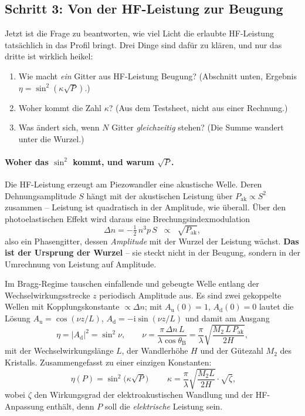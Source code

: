 \documentclass[11pt,a4paper]{article}
\begin{document}
\subsection{Schritt 3: Von der HF-Leistung zur Beugung}\label{sec:beugung}

Jetzt ist die Frage zu beantworten, wie viel Licht die erlaubte HF-Leistung
tatsächlich in das Profil bringt. Drei Dinge sind dafür zu klären, und nur
das dritte ist wirklich heikel:
\begin{enumerate}\itemsep0.15em
  \item Wie macht \emph{ein} Gitter aus HF-Leistung Beugung? (Abschnitt unten,
        Ergebnis $\eta=\sin^2(\kappa\sqrt{P})$.)
  \item Woher kommt die Zahl $\kappa$? (Aus dem Testsheet, nicht aus einer Rechnung.)
  \item Was ändert sich, wenn $N$ Gitter \emph{gleichzeitig} stehen?
        (Die Summe wandert unter die Wurzel.)
\end{enumerate}

\paragraph{Woher das \boldmath$\sin^2$ kommt, und warum \boldmath$\sqrt{P}$.}
Die HF-Leistung erzeugt am Piezowandler eine akustische Welle. Deren
Dehnungsamplitude $S$ hängt mit der akustischen Leistung über
$P_\mathrm{ak}\propto S^2$ zusammen -- Leistung ist quadratisch in der
Amplitude, wie überall. Über den photoelastischen Effekt wird daraus eine
Brechungsindexmodulation
\begin{equation}
  \Delta n = -\tfrac{1}{2}\,n^3 p\,S \;\;\propto\;\; \sqrt{P_\mathrm{ak}} ,
  \label{eq:photoelast}
\end{equation}
also ein Phasengitter, dessen \emph{Amplitude} mit der Wurzel der Leistung
wächst. \textbf{Das ist der Ursprung der Wurzel} -- sie steckt nicht in der
Beugung, sondern in der Umrechnung von Leistung auf Amplitude.

Im Bragg-Regime tauschen einfallende und gebeugte Welle entlang der
Wechselwirkungsstrecke $z$ periodisch Amplitude aus. Es sind zwei gekoppelte
Wellen mit Kopplungskonstante $\propto\Delta n$; mit $A_\mathrm{u}(0)=1$, $A_\mathrm{d}(0)=0$
lautet die Lösung $A_\mathrm{u}=\cos(\nu z/L)$, $A_\mathrm{d}=-\mathrm{i}\sin(\nu z/L)$ und
damit am Ausgang
\begin{equation}
  \eta = |A_\mathrm{d}|^2 = \sin^2\nu , \qquad
  \nu = \frac{\pi\,\Delta n\,L}{\lambda\cos\theta_\mathrm{B}}
      = \frac{\pi}{\lambda}\sqrt{\frac{M_2\,L\,P_\mathrm{ak}}{2H}} ,
\end{equation}
mit der Wechselwirkungslänge $L$, der Wandlerhöhe $H$ und der Gütezahl $M_2$
des Kristalls. Zusammengefasst zu einer einzigen Konstanten:
\begin{equation}
  \boxed{\;\eta(P) = \sin^2\!\bigl(\kappa\sqrt{P}\bigr)\;}
  \qquad
  \kappa = \frac{\pi}{\lambda}\sqrt{\frac{M_2 L}{2H}}\cdot\sqrt{\zeta} ,
  \label{eq:etasingle}
\end{equation}
wobei $\zeta$ den Wirkungsgrad der elektroakustischen Wandlung und der
HF-Anpassung enthält, denn $P$ soll die \emph{elektrische} Leistung sein.
\end{document}
